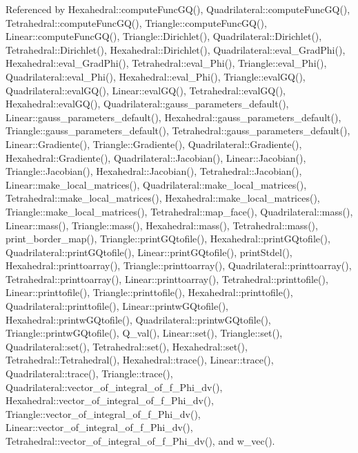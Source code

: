 Referenced by Hexahedral\+::compute\+Func\+G\+Q(), Quadrilateral\+::compute\+Func\+G\+Q(), Tetrahedral\+::compute\+Func\+G\+Q(), Triangle\+::compute\+Func\+G\+Q(), Linear\+::compute\+Func\+G\+Q(), Triangle\+::\+Dirichlet(), Quadrilateral\+::\+Dirichlet(), Tetrahedral\+::\+Dirichlet(), Hexahedral\+::\+Dirichlet(), Quadrilateral\+::eval\+\_\+\+Grad\+Phi(), Hexahedral\+::eval\+\_\+\+Grad\+Phi(), Tetrahedral\+::eval\+\_\+\+Phi(), Triangle\+::eval\+\_\+\+Phi(), Quadrilateral\+::eval\+\_\+\+Phi(), Hexahedral\+::eval\+\_\+\+Phi(), Triangle\+::eval\+G\+Q(), Quadrilateral\+::eval\+G\+Q(), Linear\+::eval\+G\+Q(), Tetrahedral\+::eval\+G\+Q(), Hexahedral\+::eval\+G\+Q(), Quadrilateral\+::gauss\+\_\+parameters\+\_\+default(), Linear\+::gauss\+\_\+parameters\+\_\+default(), Hexahedral\+::gauss\+\_\+parameters\+\_\+default(), Triangle\+::gauss\+\_\+parameters\+\_\+default(), Tetrahedral\+::gauss\+\_\+parameters\+\_\+default(), Linear\+::\+Gradiente(), Triangle\+::\+Gradiente(), Quadrilateral\+::\+Gradiente(), Hexahedral\+::\+Gradiente(), Quadrilateral\+::\+Jacobian(), Linear\+::\+Jacobian(), Triangle\+::\+Jacobian(), Hexahedral\+::\+Jacobian(), Tetrahedral\+::\+Jacobian(), Linear\+::make\+\_\+local\+\_\+matrices(), Quadrilateral\+::make\+\_\+local\+\_\+matrices(), Tetrahedral\+::make\+\_\+local\+\_\+matrices(), Hexahedral\+::make\+\_\+local\+\_\+matrices(), Triangle\+::make\+\_\+local\+\_\+matrices(), Tetrahedral\+::map\+\_\+face(), Quadrilateral\+::mass(), Linear\+::mass(), Triangle\+::mass(), Hexahedral\+::mass(), Tetrahedral\+::mass(), print\+\_\+border\+\_\+map(), Triangle\+::print\+G\+Qtofile(), Hexahedral\+::print\+G\+Qtofile(), Quadrilateral\+::print\+G\+Qtofile(), Linear\+::print\+G\+Qtofile(), print\+Stdel(), Hexahedral\+::printtoarray(), Triangle\+::printtoarray(), Quadrilateral\+::printtoarray(), Tetrahedral\+::printtoarray(), Linear\+::printtoarray(), Tetrahedral\+::printtofile(), Linear\+::printtofile(), Triangle\+::printtofile(), Hexahedral\+::printtofile(), Quadrilateral\+::printtofile(), Linear\+::printw\+G\+Qtofile(), Hexahedral\+::printw\+G\+Qtofile(), Quadrilateral\+::printw\+G\+Qtofile(), Triangle\+::printw\+G\+Qtofile(), Q\+\_\+val(), Linear\+::set(), Triangle\+::set(), Quadrilateral\+::set(), Tetrahedral\+::set(), Hexahedral\+::set(), Tetrahedral\+::\+Tetrahedral(), Hexahedral\+::trace(), Linear\+::trace(), Quadrilateral\+::trace(), Triangle\+::trace(), Quadrilateral\+::vector\+\_\+of\+\_\+integral\+\_\+of\+\_\+f\+\_\+\+Phi\+\_\+dv(), Hexahedral\+::vector\+\_\+of\+\_\+integral\+\_\+of\+\_\+f\+\_\+\+Phi\+\_\+dv(), Triangle\+::vector\+\_\+of\+\_\+integral\+\_\+of\+\_\+f\+\_\+\+Phi\+\_\+dv(), Linear\+::vector\+\_\+of\+\_\+integral\+\_\+of\+\_\+f\+\_\+\+Phi\+\_\+dv(), Tetrahedral\+::vector\+\_\+of\+\_\+integral\+\_\+of\+\_\+f\+\_\+\+Phi\+\_\+dv(), and w\+\_\+vec().

